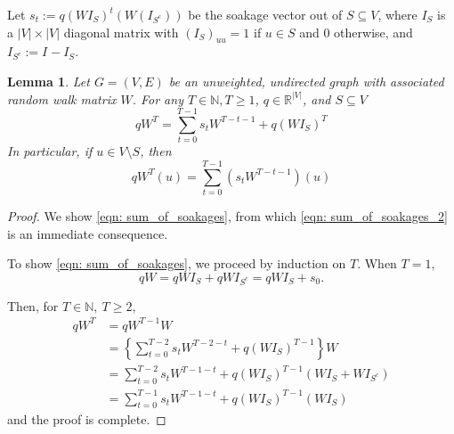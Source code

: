 \documentclass[11pt,twoside]{article}
\newtheorem{lemma}{Lemma}
\newcommand{\abs}[1]{\left \lvert #1 \right \rvert}
\newcommand{\Reals}{\mathbb{R}}
\newcommand{\1}{\mathbf{1}}
\newcommand{\Wbf}{W}
\newcommand{\Ibf}[1]{I_{#1}}
\begin{document}
Let $s_t := q(\Wbf \Ibf{S})^t(\Wbf(\Ibf{S^c}))$ be the soakage vector out of $S \subseteq V$, where $\Ibf{S}$ is a $\abs{V} \times \abs{V}$ diagonal matrix with $(\Ibf{S})_{uu} = 1$ if $u \in S$ and 0 otherwise, and $\Ibf{S^c} := \Ibf{} - \Ibf{S}$. 
\begin{lemma}
	\label{lem: sum_of_soakages}
	Let $G = (V,E)$ be an unweighted, undirected graph with associated random walk matrix $\Wbf$. For any $T \in \mathbb{N}, T \geq 1$, $q \in \Reals^{\abs{V}}$, and $S \subseteq V$
	\begin{equation}
	\label{eqn: sum_of_soakages}
	q\Wbf^T = \sum_{t = 0}^{T - 1} s_t \Wbf^{T - t - 1} + q(\Wbf \Ibf{S})^T
	\end{equation}
	In particular, if $u \in V\setminus S$, then
	\begin{equation}
	\label{eqn: sum_of_soakages_2}
	q\Wbf^T(u) = \sum_{t = 0}^{T - 1} \left(s_t \Wbf^{T - t - 1}\right)(u)
	\end{equation}
\end{lemma}
\begin{proof}	
	We show \eqref{eqn: sum_of_soakages}, from which \eqref{eqn: sum_of_soakages_2} is an immediate consequence.
	
	
	To show \eqref{eqn: sum_of_soakages}, we proceed by induction on $T$. When $T = 1$,
	\begin{equation*}
	q\Wbf = q\Wbf\Ibf{S} + q\Wbf\Ibf{S^c} =  q\Wbf\Ibf{S} + s_0. 
	\end{equation*}
	
	Then, for $T \in \mathbb{N},~ T \geq 2$,
	\begin{align*}
	q\Wbf^{T} & = q\Wbf^{T - 1}{\Wbf} \\
	& = \left\{\sum_{t = 0}^{T - 2} s_t \Wbf^{T - 2 - t} + q(\Wbf \Ibf{S})^{T - 1} \right\} \Wbf \tag{by the inductive hypothesis}\\
	& = \sum_{t = 0}^{T - 2} s_t \Wbf^{T - 1 - t} + q(\Wbf \Ibf{S})^{T - 1} (\Wbf \Ibf{S} + \Wbf \Ibf{S^c}) \\
	& = \sum_{t = 0}^{T - 1} s_t \Wbf^{T - 1 - t} + q(\Wbf \Ibf{S})^{T - 1} (\Wbf \Ibf{S})
	\end{align*}
	and the proof is complete.
\end{proof}
\end{document}
